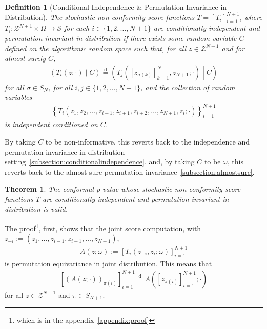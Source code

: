 \documentclass{article}
\newcommand{\oo}[1]{\left( #1 \right)}
\newcommand{\cc}[1]{\left[ #1 \right]}
\newtheorem{theorem}{Theorem}
\newtheorem{definition}{Definition}
\begin{document}
    \begin{definition}
    [Conditional Independence \& Permutation Invariance in Distribution]
        \label{definition:CIS}
            The stochastic non-conformity score functions $T=[T_i]_{i=1}^{N+1}$, where $T_i: \mathcal{Z}^{N+1}\times \Omega \to \mathcal{S}$ for each $i \in \{1,2,\dots, N+1\}$ are conditionally independent and permutation invariant in distribution if there exists some random variable $C$ defined on the algorithmic random space such that, for all $z \in \mathcal{Z}^{N+1}$ and for almost surely $C$,
            \begin{align}
            \label{eqn:condsym}
                \left(T_i\oo{z; \cdot} \middle\vert C\right)
                \overset{\text{d}}{=}
                \left(T_j\oo{\cc{z_{\sigma(k)}}_{k=1}^N, z_{N+1}; \cdot} \middle\vert C\right)
            \end{align}
            for all $\sigma \in S_N$, for all $i,j \in \{1,2,\dots, N+1\}$, and the collection of random variables
            \begin{align*}
                \left\{
                    T_i\oo{z_1, z_2, \dots, z_{i-1}, z_{i+1}, z_{i+2}, \dots, z_{N+1}, z_i;\cdot}
                \right\}_{i=1}^{N+1}
            \end{align*}
            is independent conditioned on $C$.
        \end{definition}

        By taking $C$ to be non-informative, this reverts back to the independence and permutation invariance in distribution setting~\ref{subsection:conditionalindependence}, and, by taking $C$ to be $\omega$, this reverts back to the almost sure permutation invariance~\ref{subsection:almostsure}.

        \begin{theorem}
        \label{theorem:validity}
            The conformal p-value whose stochastic non-conformity score functions $T$ are conditionally independent and permutation invariant in distribution is valid.
        \end{theorem}
        The proof\footnote{which is in the appendix~\ref{appendix:proof}}, first, shows that the joint score computation, with
        $z_{-i}:=(z_1,\ldots,z_{i-1},z_{i+1},\ldots,z_{N+1})$,
        \begin{align*}
            A(z;\omega) := \cc{T_i\oo{z_{-i},z_i;\omega}}_{i=1}^{N+1}
        \end{align*}
    is permutation equivariance in joint distribution. This means that
        \begin{align*}
            \cc{\oo{A(z; \cdot)}_{\pi(i)}}_{i=1}^{N+1} \overset{\text{d}}{=} A(\cc{z_{\pi(i)}}_{i=1}^{N+1};\cdot)
        \end{align*}
        for all $z \in \mathcal{Z}^{N+1}$ and $\pi \in S_{N+1}$.
\end{document}
